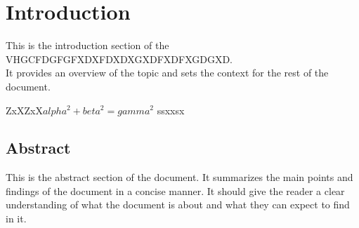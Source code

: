 \documentclass[UTF8]{ctexart}
\begin{document}
\section*{Introduction}
This is the introduction section of the VHGCFDGFGFXDXFDXDXGXDFXDFXGDGXD. \\It provides an overview of the topic and sets the context for the rest of the document.

ZxXZxX$alpha^2 + beta^2 = gamma^2$ ssxxsx

\subsection*{Abstract}
This is the abstract section of the document. It summarizes the main points and findings of the document in a concise manner. It should give the reader a clear understanding of what the document is about and what they can expect to find in it.
\end{document}

